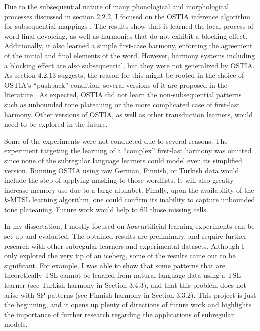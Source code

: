Due to the subsequential nature of many phonological and morphological processes discussed in section 2.2.2, I focused on the OSTIA inference algorithm for subsequential mappings \citep{OncinaEtAl1993,DeLaHiguera2010}.
The results show that it learned the local process of word-final devoicing, as well as harmonies that do not exhibit a blocking effect.
Additionally, it also learned a simple first-case harmony, enforcing the agreement of the initial and final elements of the word.
However, harmony systems including a blocking effect are also subsequential, but they were not generalized by OSTIA.
As section 4.2.13 suggests, the reason for this might be rooted in the choice of OSTIA's ``pushback'' condition: several versions of it are proposed in the literature \citep{OncinaEtAl1993,DeLaHiguera2010,DeLaHiguera2011}.
As expected, OSTIA did not learn the non-subsequential patterns such as unbounded tone plateauing or the more complicated case of first-last harmony.
Other versions of OSTIA, as well as other transduction learners, would need to be explored in the future.



Some of the experiments were not conducted due to several reasons.
The experiment targeting the learning of a ``complex'' first-last harmony was omitted since none of the subregular language learners could model even its simplified version.
Running OSTIA using raw German, Finnish, or Turkish data would include the step of applying masking to those wordlists.
It will also greatly increase memory use due to a large alphabet.
Finally, upon the availability of the $k$-MTSL learning algorithm, one could confirm its inability to capture unbounded tone plateauing.
Future work would help to fill those missing cells.


In my dissertation, I mostly focused on \emph{how} artificial learning experiments can be set up and evaluated.
The obtained results are preliminary, and require further research with other subregular learners and experimental datasets.
Although I only explored the very tip of an iceberg, some of the results came out to be significant.
For example, I was able to show that some patterns that are theoretically TSL cannot be learned from natural language data using a TSL learner (see Turkish harmony in Section 3.4.3), and that this problem does not arise with SP patterns (see Finnish harmony in Section 3.3.2).
This project is just the beginning, and it opens up plenty of directions of future work and highlights the importance of further research regarding the applications of subregular models.




